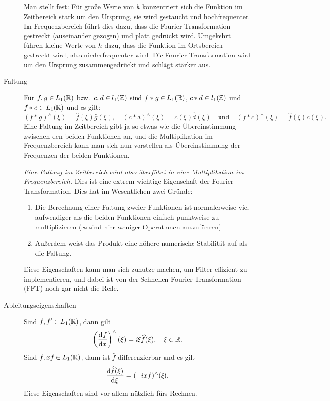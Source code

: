 \begin{remark}
\begin{description}
    Man stellt fest: Für große Werte von $ h $ konzentriert sich die Funktion im Zeitbereich stark 
    um den Ursprung, sie wird gestaucht und hochfrequenter. Im Frequenzbereich führt dies dazu,
    dass die Fourier-Transformation gestreckt (auseinander gezogen) und platt gedrückt wird.
    Umgekehrt führen kleine Werte von $ h $ dazu, dass die Funktion im Ortsbereich gestreckt wird,
    also niederfrequenter wird. Die Fourier-Transformation wird um den Ursprung zusammengedrückt und
    schlägt stärker aus.
    
		\item [Faltung] Für $ f, g \in L_{1}(\mathbb{R}) $ bzw.\ $ c, d \in l_{1}(\mathbb{Z}) $ sind 
  	$ f * g \in L_{1}(\mathbb{R}) $, $ c * d \in l_{1}(\mathbb{Z}) $ und $ f * c \in L_{1}(\mathbb{R}) $ und es gilt:
    \[
      (f * g)^{\wedge}(\xi) = \widehat{f}(\xi) \widehat{g}(\xi), \quad
      (c * d)^{\wedge}(\xi) = \widehat{c}(\xi) \widehat{d}(\xi)  \quad \text{und} \quad
      (f * c)^{\wedge}(\xi) = \widehat{f}(\xi) \widehat{c}(\xi).
    \]
    Eine Faltung im Zeitbereich gibt ja so etwas wie die Übereinstimmung zwischen den beiden 
    Funktionen an, und die Multiplikation im Frequenzbereich kann man sich nun vorstellen als
    Übereinstimmung der Frequenzen der beiden Funktionen.
    
    \emph{Eine Faltung im Zeitbereich wird also überführt in eine Multiplikation im   
    Frequenzbereich.} Dies ist eine extrem wichtige Eigenschaft der Fourier-Transformation. Dies hat
    im Wesentlichen zwei Gründe:
    \begin{enumerate}
    \item Die Berechnung einer Faltung zweier Funktionen ist normalerweise viel aufwendiger als die 
        beiden Funktionen einfach punktweise zu multiplizieren (es sind hier weniger Operationen
        auszuführen).
    \item Außerdem weist das Produkt eine höhere numerische Stabilität auf als die Faltung.
    \end{enumerate}
    Diese Eigenschaften kann man sich zunutze machen, um Filter effizient zu implementieren, und
    dabei ist von der Schnellen Fourier-Transformation (FFT) noch gar nicht die Rede.
        
		\item [Ableitungseigenschaften] Sind $ f, f' \in L_{1}(\mathbb{R}) $, dann gilt
    \[
      \left( \dod{f}{x} \right)^{\wedge}(\xi) = i\xi \widehat{f}(\xi), \quad \xi \in \R.
    \]
    Sind $ f, xf \in L_{1}(\mathbb{R}) $, dann ist $ \widehat{f} $ differenzierbar und es gilt
    \[
      \dod{\widehat{f}(\xi)}{\xi} = (-ix f)^{\wedge}(\xi).
    \]
    Diese Eigenschaften sind vor allem nützlich fürs Rechnen.
    

\end{description}
\end{remark}
